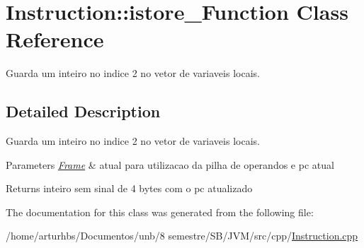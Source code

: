 \hypertarget{classInstruction_1_1istore__2Function}{}\section{Instruction\+:\+:istore\+\_\+Function Class Reference}
\label{classInstruction_1_1istore__2Function}


Guarda um inteiro no indice 2 no vetor de variaveis locais.  




\subsection{Detailed Description}
Guarda um inteiro no indice 2 no vetor de variaveis locais. 


\begin{DoxyParams}{Parameters}
{\em \hyperlink{classFrame}{Frame}} & atual para utilizacao da pilha de operandos e pc atual \\
\hline
\end{DoxyParams}
\begin{DoxyReturn}{Returns}
inteiro sem sinal de 4 bytes com o pc atualizado 
\end{DoxyReturn}


The documentation for this class was generated from the following file\+:\begin{DoxyCompactItemize}
\item 
/home/arturhbs/\+Documentos/unb/8 semestre/\+S\+B/\+J\+V\+M/src/cpp/\hyperlink{Instruction_8cpp}{Instruction.\+cpp}\end{DoxyCompactItemize}
